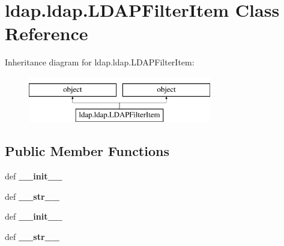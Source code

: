 \hypertarget{classldap_1_1ldap_1_1LDAPFilterItem}{\section{ldap.\-ldap.\-L\-D\-A\-P\-Filter\-Item Class Reference}
\label{classldap_1_1ldap_1_1LDAPFilterItem}
}
Inheritance diagram for ldap.\-ldap.\-L\-D\-A\-P\-Filter\-Item\-:\begin{figure}[H]
\begin{center}
\leavevmode
\includegraphics[height=2.000000cm]{classldap_1_1ldap_1_1LDAPFilterItem}
\end{center}
\end{figure}
\subsection*{Public Member Functions}
\begin{DoxyCompactItemize}
\item 
\hypertarget{classldap_1_1ldap_1_1LDAPFilterItem_a687ad0aea738fa8c7d05085b97ab8d3e}{def {\bfseries \-\_\-\-\_\-init\-\_\-\-\_\-}}\label{classldap_1_1ldap_1_1LDAPFilterItem_a687ad0aea738fa8c7d05085b97ab8d3e}

\item 
\hypertarget{classldap_1_1ldap_1_1LDAPFilterItem_a75d2cdee5c84d932992e69bbae14a1eb}{def {\bfseries \-\_\-\-\_\-str\-\_\-\-\_\-}}\label{classldap_1_1ldap_1_1LDAPFilterItem_a75d2cdee5c84d932992e69bbae14a1eb}

\item 
\hypertarget{classldap_1_1ldap_1_1LDAPFilterItem_a687ad0aea738fa8c7d05085b97ab8d3e}{def {\bfseries \-\_\-\-\_\-init\-\_\-\-\_\-}}\label{classldap_1_1ldap_1_1LDAPFilterItem_a687ad0aea738fa8c7d05085b97ab8d3e}

\item 
\hypertarget{classldap_1_1ldap_1_1LDAPFilterItem_a75d2cdee5c84d932992e69bbae14a1eb}{def {\bfseries \-\_\-\-\_\-str\-\_\-\-\_\-}}\label{classldap_1_1ldap_1_1LDAPFilterItem_a75d2cdee5c84d932992e69bbae14a1eb}

\end{DoxyCompactItemize}

